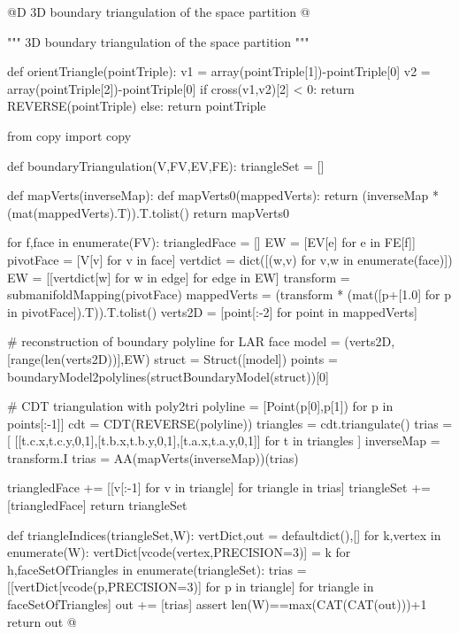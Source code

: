 \documentclass[11pt,oneside]{article}    %
\begin{document}
@D 3D boundary triangulation of the space partition 
@{""" 3D boundary triangulation of the space partition """

def orientTriangle(pointTriple):
    v1 = array(pointTriple[1])-pointTriple[0]
    v2 = array(pointTriple[2])-pointTriple[0]
    if cross(v1,v2)[2] < 0: return REVERSE(pointTriple)
    else: return pointTriple
    
from copy import copy

def boundaryTriangulation(V,FV,EV,FE):
    triangleSet = []  
    
    def mapVerts(inverseMap):
        def mapVerts0(mappedVerts):
            return (inverseMap * (mat(mappedVerts).T)).T.tolist()
        return mapVerts0
        
    for f,face in enumerate(FV):
        triangledFace = []
        EW = [EV[e] for e in FE[f]]
        pivotFace = [V[v] for v in face]
        vertdict = dict([(w,v) for v,w in enumerate(face)])
        EW = [[vertdict[w] for w in edge] for edge in EW]
        transform = submanifoldMapping(pivotFace)
        mappedVerts = (transform * (mat([p+[1.0] for p in pivotFace]).T)).T.tolist()
        verts2D = [point[:-2] for point in mappedVerts] 
              
        # reconstruction of boundary polyline for LAR face
        model = (verts2D,[range(len(verts2D))],EW)
        struct = Struct([model])
        points = boundaryModel2polylines(structBoundaryModel(struct))[0]
        
        # CDT triangulation with poly2tri
        polyline = [Point(p[0],p[1]) for p in points[:-1]]  
        cdt = CDT(REVERSE(polyline))
        triangles = cdt.triangulate()
        trias = [ [[t.c.x,t.c.y,0,1],[t.b.x,t.b.y,0,1],[t.a.x,t.a.y,0,1]] for t in triangles ]
        inverseMap = transform.I
        trias = AA(mapVerts(inverseMap))(trias)
        
        triangledFace += [[v[:-1] for v in triangle] for triangle in trias]
        triangleSet += [triangledFace]
    return triangleSet

def triangleIndices(triangleSet,W):
    vertDict,out = defaultdict(),[]
    for k,vertex in enumerate(W):  vertDict[vcode(vertex,PRECISION=3)] = k
    for h,faceSetOfTriangles in enumerate(triangleSet):
        trias = [[vertDict[vcode(p,PRECISION=3)] for p in triangle]
                    for triangle in faceSetOfTriangles]
        out += [trias]
    assert len(W)==max(CAT(CAT(out)))+1
    return out
@}
\end{document}
